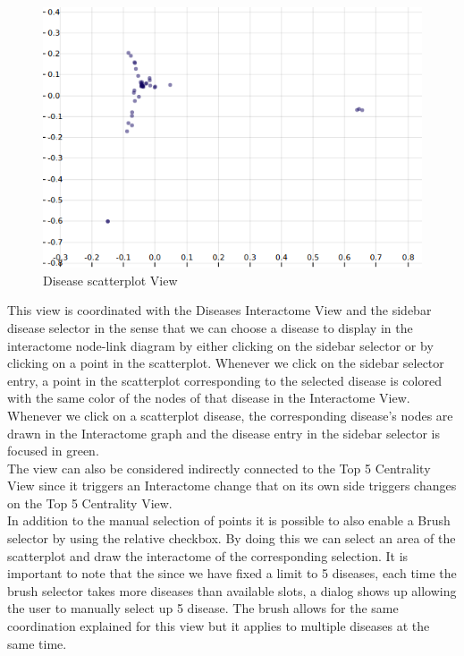 \documentclass[12pt,twocolumn,twoside]{article}
\begin{document}
	\begin{figure}
		\includegraphics[width=.95\linewidth]{disease-scatterplot-mds.png}
		\caption{Disease scatterplot View}
		\label{scatter}
	\end{figure}
	This view is coordinated with the Diseases Interactome View and the sidebar disease selector in the sense that we can choose a disease to display in the interactome node-link diagram by either clicking on the sidebar selector or by clicking on a point in the scatterplot. Whenever we click on the sidebar selector entry, a point in the scatterplot corresponding to the selected disease is colored with the same color of the nodes of that disease in the Interactome View. Whenever we click on a scatterplot disease, the corresponding disease's nodes are drawn in the Interactome graph and the disease entry in the sidebar selector is focused in green.\\ The view can also be considered indirectly connected to the Top 5 Centrality View since it triggers an Interactome change that on its own side triggers changes on the Top 5 Centrality View. \\ In addition to the manual selection of points it is possible to also enable a Brush selector by using the relative checkbox. By doing this we can select an area of the scatterplot and draw the interactome of the corresponding selection. It is important to note that the since we have fixed a limit to 5 diseases, each time the brush selector takes more diseases than available slots, a dialog shows up allowing the user to manually select up 5 disease. The brush allows for the same coordination explained for this view but it applies to multiple diseases at the same time. 
	
\end{document}
